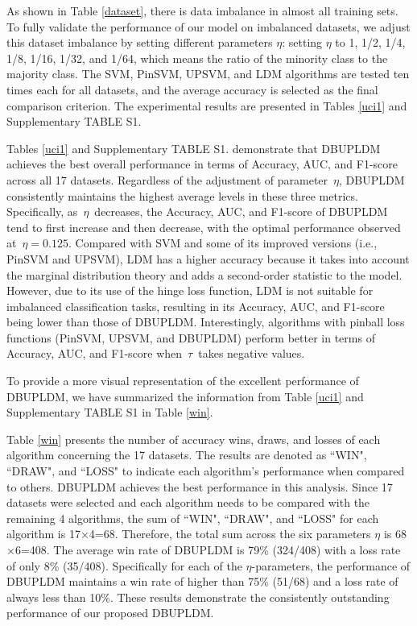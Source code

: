 \documentclass[a4paper]{cas-sc}
\begin{document}
As shown in Table \ref{dataset}, there is data imbalance in almost all training sets. To fully validate the performance of our model on imbalanced datasets, we adjust this dataset imbalance by setting different parameters $\eta$: setting $\eta$ to 1, 1/2, 1/4, 1/8, 1/16, 1/32, and 1/64, which means the ratio of the minority class to the majority class. The SVM, PinSVM, UPSVM, and LDM algorithms are tested ten times each for all datasets, and the average accuracy is selected as the final comparison criterion. The experimental results are presented in Tables \ref{uci1} and Supplementary TABLE S1.



{\color{orange}Tables \ref{uci1} and Supplementary TABLE S1. demonstrate that DBUPLDM achieves the best overall performance in terms of Accuracy, AUC, and F1-score across all 17 datasets. Regardless of the adjustment of parameter \(\eta\), DBUPLDM consistently maintains the highest average levels in these three metrics. Specifically, as \(\eta\) decreases, the Accuracy, AUC, and F1-score of DBUPLDM tend to first increase and then decrease, with the optimal performance observed at \(\eta = 0.125\). Compared with SVM and some of its improved versions (i.e., PinSVM and UPSVM), LDM has a higher accuracy because it takes into account the marginal distribution theory and adds a second-order statistic to the model. However, due to its use of the hinge loss function, LDM is not suitable for imbalanced classification tasks, resulting in its Accuracy, AUC, and F1-score being lower than those of DBUPLDM. Interestingly, algorithms with pinball loss functions (PinSVM, UPSVM, and DBUPLDM) perform better in terms of Accuracy, AUC, and F1-score when \(\tau\) takes negative values.}

To provide a more visual representation of the excellent performance of DBUPLDM, we have summarized the information from Table \ref{uci1}  and Supplementary TABLE S1 in Table \ref{win}.



Table \ref{win} presents the number of accuracy wins, draws, and losses of each algorithm concerning the 17 datasets. The results are denoted as ``WIN", ``DRAW", and ``LOSS" to indicate each algorithm's performance when compared to others. DBUPLDM achieves the best performance in this analysis. Since 17 datasets were selected and each algorithm needs to be compared with the remaining 4 algorithms, the sum of ``WIN", ``DRAW", and ``LOSS" for each algorithm is 17$\times$4=68. Therefore, the total sum across the six parameters $\eta$ is 68$\times$6=408. The average win rate of DBUPLDM is 79\% (324/408) with a loss rate of only 8\% (35/408). Specifically for each of the $\eta$-parameters, the performance of DBUPLDM maintains a win rate of higher than 75\% (51/68) and a loss rate of always less than 10\%. These results demonstrate the consistently outstanding performance of our proposed DBUPLDM.
\end{document}
